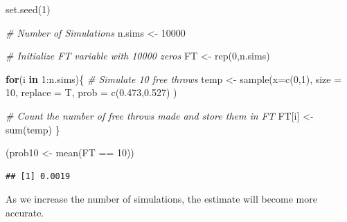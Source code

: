 \documentclass[
  11pt,
]{book}
\newenvironment{Shaded}{\begin{snugshade}}{\end{snugshade}}
\newcommand{\AttributeTok}[1]{\textcolor[rgb]{0.77,0.63,0.00}{#1}}
\newcommand{\CommentTok}[1]{\textcolor[rgb]{0.56,0.35,0.01}{\textit{#1}}}
\newcommand{\ControlFlowTok}[1]{\textcolor[rgb]{0.13,0.29,0.53}{\textbf{#1}}}
\newcommand{\DecValTok}[1]{\textcolor[rgb]{0.00,0.00,0.81}{#1}}
\newcommand{\FloatTok}[1]{\textcolor[rgb]{0.00,0.00,0.81}{#1}}
\newcommand{\FunctionTok}[1]{\textcolor[rgb]{0.00,0.00,0.00}{#1}}
\newcommand{\NormalTok}[1]{#1}
\newcommand{\OtherTok}[1]{\textcolor[rgb]{0.56,0.35,0.01}{#1}}
\newcommand{\SpecialCharTok}[1]{\textcolor[rgb]{0.00,0.00,0.00}{#1}}
\theoremstyle{definition}
\theoremstyle{definition}
\theoremstyle{definition}
\theoremstyle{definition}
\theoremstyle{remark}
\begin{document}
\begin{Shaded}
\begin{Highlighting}[]
\FunctionTok{set.seed}\NormalTok{(}\DecValTok{1}\NormalTok{)}

\CommentTok{\# Number of Simulations}
\NormalTok{n.sims }\OtherTok{\textless{}{-}} \DecValTok{10000}

\CommentTok{\# Initialize FT variable with 10000 zeros}
\NormalTok{FT }\OtherTok{\textless{}{-}} \FunctionTok{rep}\NormalTok{(}\DecValTok{0}\NormalTok{,n.sims)}

\ControlFlowTok{for}\NormalTok{(i }\ControlFlowTok{in} \DecValTok{1}\SpecialCharTok{:}\NormalTok{n.sims)\{}
  \CommentTok{\# Simulate 10 free throws}
\NormalTok{  temp }\OtherTok{\textless{}{-}} \FunctionTok{sample}\NormalTok{(}\AttributeTok{x=}\FunctionTok{c}\NormalTok{(}\DecValTok{0}\NormalTok{,}\DecValTok{1}\NormalTok{), }\AttributeTok{size =} \DecValTok{10}\NormalTok{, }\AttributeTok{replace =}\NormalTok{ T, }\AttributeTok{prob =} \FunctionTok{c}\NormalTok{(}\FloatTok{0.473}\NormalTok{,}\FloatTok{0.527}\NormalTok{) )}
  
  \CommentTok{\# Count the number of free throws made and store them in FT}
\NormalTok{  FT[i] }\OtherTok{\textless{}{-}} \FunctionTok{sum}\NormalTok{(temp)}
\NormalTok{\}}

\NormalTok{(prob10 }\OtherTok{\textless{}{-}} \FunctionTok{mean}\NormalTok{(FT }\SpecialCharTok{==} \DecValTok{10}\NormalTok{))}
\end{Highlighting}
\end{Shaded}

\begin{verbatim}
## [1] 0.0019
\end{verbatim}

As we increase the number of simulations, the estimate will become more accurate.
\end{document}
